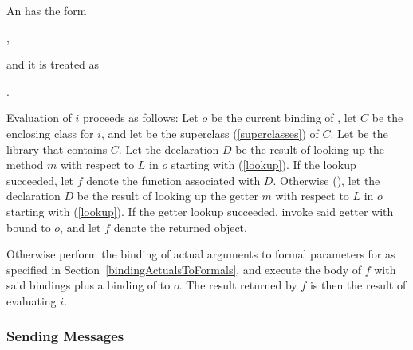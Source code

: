 \documentclass[makeidx]{article}
\begin{document}
{{

\LMHash{}%
An
has the form

\noindent
{},

\noindent
and it is treated as

\noindent
{}.


\LMHash{}%
%
Evaluation of $i$ proceeds as follows:
Let $o$ be the current binding of \THIS,
let $C$ be the enclosing class for $i$,
and let \SuperClass{} be the superclass (\ref{superclasses}) of $C$.
Let  be the library that contains $C$.
%
Let the declaration $D$ be the result of looking up
the method $m$ with respect to $L$ in $o$ starting with \SuperClass{}
(\ref{lookup}).
If the lookup succeeded,
let $f$ denote the function associated with $D$.
%
Otherwise (),
let the declaration $D$ be the result of looking up
the getter $m$ with respect to $L$ in $o$ starting with \SuperClass{}
(\ref{lookup}).
If the getter lookup succeeded,
invoke said getter with \THIS{} bound to $o$,
and let $f$ denote the returned object.


\LMHash{}%
Otherwise perform the binding of actual arguments to formal parameters for
as specified in Section~\ref{bindingActualsToFormals},
and execute the body of $f$ with said bindings
plus a binding of \THIS{} to $o$.
The result returned by $f$ is then the result of evaluating $i$.

} %


\subsubsection{Sending Messages}

}
\end{document}
